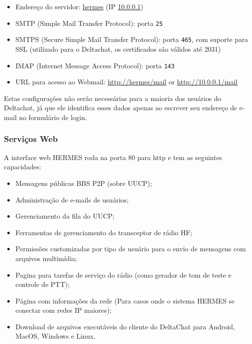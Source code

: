 \documentclass[11pt,a4paper]{article}
\begin{document}
\begin{itemize}
    \item Endereço do servidor: \url{hermes} (IP \url{10.0.0.1})
    \item SMTP (Simple Mail Transfer Protocol): porta \texttt{25}
    \item SMTPS (Secure Simple Mail Transfer Protocol): porta \texttt{465}, com suporte para SSL  
    (utilizado para o Deltachat, os certificados são válidos até 2031)
    \item IMAP (Internet Message Access Protocol): porta \texttt{143}
    \item URL para acesso ao Webmail: \url{http://hermes/mail} or \url{http://10.0.0.1/mail}
\end{itemize}

Estas configurações não serão necessárias para a maioria dos usuários do Deltachat, já que ele identifica esses dados apenas ao escrever seu endereço de e-mail no formulário de login.


\subsubsection{Serviços Web}
\label{apx_net_web}

A interface web HERMES roda na porta 80 para http e tem as seguintes capacidades:
\begin{itemize}
    \item Mensagens públicas BBS P2P (sobre UUCP);

    \item Administração de e-mails de usuários;
    \item Gerenciamento da fila do UUCP;
    \item Ferramentas de gerenciamento do transceptor de rádio HF;
    \item Permissões customizadas por tipo de usuário para o envio de mensagens com arquivos multimídia;
    \item Pagina para tarefas de serviço do rádio (como gerador de tom de teste e controle de PTT);
    \item Página com informações da rede (Para casos onde o sistema HERMES se conectar com redes IP maiores);
    \item Download de arquivos executáveis do cliente do DeltaChat para Android, MacOS, Windows e Linux.
\end{itemize}
\end{document}
